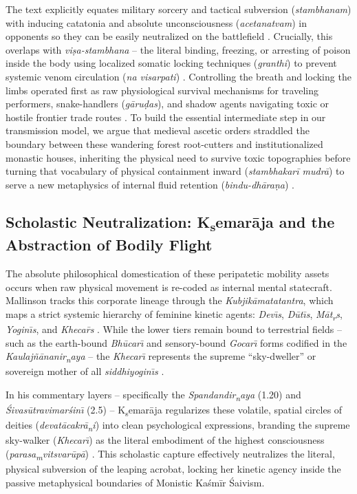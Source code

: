 \documentclass[11pt,twoside,letterpaper]{article}
\begin{document}
The text explicitly equates military sorcery and tactical subversion (\textit{stambhanam}) with inducing catatonia and absolute unconsciousness (\textit{acetanatvam}) in opponents so they can be easily neutralized on the battlefield \cite{KauśP}. Crucially, this overlaps with \textit{viṣa-stambhana} -- the literal binding, freezing, or arresting of poison inside the body using localized somatic locking techniques (\textit{granthi}) to prevent systemic venom circulation (\textit{na visarpati}) \cite{KauśP}. Controlling the breath and locking the limbs operated first as raw physiological survival mechanisms for traveling performers, snake-handlers (\textit{gāruḍas}), and shadow agents navigating toxic or hostile frontier trade routes \cite{Birch2024}. To build the essential intermediate step in our transmission model, we argue that medieval ascetic orders straddled the boundary between these wandering forest root-cutters and institutionalized monastic houses, inheriting the physical need to survive toxic topographies before turning that vocabulary of physical containment inward (\textit{stambhakarī mudrā}) to serve a new metaphysics of internal fluid retention (\textit{bindu-dhāraṇa}) \cite{Birch2024}.

\subsection{Scholastic Neutralization: K\textsubscript{s}emar\={a}ja and the Abstraction of Bodily Flight}
The absolute philosophical domestication of these peripatetic mobility assets occurs when raw physical movement is re-coded as internal mental statecraft. Mallinson tracks this corporate lineage through the \textit{Kubjik\={a}matatantra}, which maps a strict systemic hierarchy of feminine kinetic agents: \textit{Dev\={\i}s}, \textit{D\={u}t\={\i}s}, \textit{M\={a}t\textsubscript{r}s}, \textit{Yogin\={\i}s}, and \textit{Khecar\={\in}s} \cite{Mallinson2007}. While the lower tiers remain bound to terrestrial fields -- such as the earth-bound \textit{Bh\={u}car\={\i}} and sensory-bound \textit{Gocar\={\i}} forms codified in the \textit{Kaulaj\~{n}\={a}nanir\textsubscript{n}aya} -- the \textit{Khecar\={\i}} represents the supreme ``sky-dweller'' or sovereign mother of all \textit{siddhiyogin\={\i}s} \cite{Mallinson2007}. 

In his commentary layers -- specifically the \textit{Spandandir\textsubscript{n}aya} (1.20) and \textit{\'{S}ivas\={u}travimar\'{s}in\={\i}} (2.5) -- K\textsubscript{s}emar\={a}ja regularizes these volatile, spatial circles of deities (\textit{devat\={a}cakr\={a}\textsubscript{n}i}) into clean psychological expressions, branding the supreme sky-walker (\textit{Khecar\={\i}}) as the literal embodiment of the highest consciousness (\textit{parasa\textsubscript{m}vitsvar\={u}p\={a}}) \cite{Mallinson2007}. This scholastic capture effectively neutralizes the literal, physical subversion of the leaping acrobat, locking her kinetic agency inside the passive metaphysical boundaries of Monistic Kaśmīr Śaivism.
\end{document}
